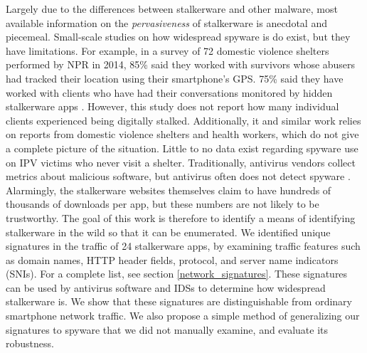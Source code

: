 \documentclass[acmtog]{acmart}
\begin{document}
Largely due to the differences between stalkerware and other malware, most 
available information on the \textit{pervasiveness} of stalkerware is anecdotal 
and piecemeal. Small-scale studies on how widespread spyware is do exist, but 
they have limitations. For example, in a survey of 72 
domestic violence shelters performed by NPR in 2014, 85\% said they worked with 
survivors whose abusers had tracked their location using their smartphone's 
GPS. 75\% said they have worked with clients who have had their conversations 
monitored by hidden stalkerware apps \cite{shahani_smartphones_nodate}. 
However, 
this study does not report how many individual clients experienced being 
digitally stalked. Additionally, it and similar work relies on 
reports from domestic violence shelters and health workers, which do not give 
a complete picture of the situation. Little to no data exist regarding spyware 
use on IPV victims who never visit a shelter. Traditionally, antivirus vendors 
collect metrics about 
malicious software, but antivirus often does not detect spyware 
\cite{chatterjee_spyware_2018}. Alarmingly, the stalkerware 
websites themselves claim to have hundreds of thousands of downloads per app, 
but these numbers are not likely to be trustworthy. The goal of this work is 
therefore to identify a means of identifying stalkerware in the wild so that it 
can be enumerated. We identified unique signatures in the traffic of 24 
stalkerware apps, by examining traffic features such as domain names, HTTP 
header fields, protocol, and server name indicators (SNIs). For a complete 
list, see section \ref{network_signatures}. These signatures can be used by 
antivirus software and IDSs to determine how widespread stalkerware is. We show 
that these signatures are distinguishable from ordinary smartphone 
network traffic. We also propose a simple method of generalizing our signatures 
to spyware that we did not manually examine, and evaluate its robustness.
\end{document}
